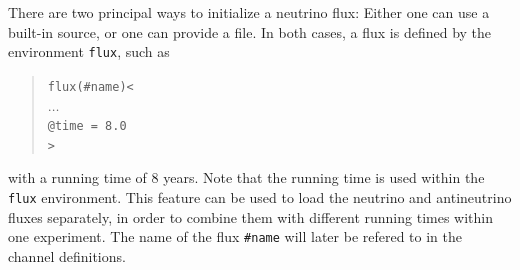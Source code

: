 There are two principal ways to initialize a neutrino flux: 
Either one can use 
a built-in source, or one can provide a file. In both cases,
a flux is defined by the environment {\tt flux}, such as
\begin{quote}
  {\tt flux(\#name)<\\
\tb $\ldots$\\
\tb @time = 8.0 \\
>}
\end{quote}
with a running time of $8$ years. Note that the running time is used within
the {\tt flux} environment. This feature can be used to load the neutrino and antineutrino fluxes separately, in order to combine them with different
running times within one experiment. The name of the flux {\tt \#name} will later be refered to in the channel definitions.

